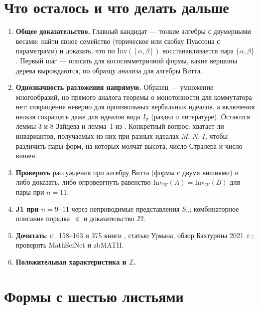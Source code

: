 \documentclass[11pt]{article}
\newcommand{\Inv}{\mathrm{Inv}}
\newcommand{\Z}{\mathbb Z}
\theoremstyle{plain}
\theoremstyle{definition}
\theoremstyle{remark}
\begin{document}
\section{Что осталось и что делать дальше}

\begin{enumerate}
\item \textbf{Общее доказательство.} Главный кандидат --- тонкие алгебры с двумерными весами: найти явное семейство (торическое или скобку Пуассона с параметрами) и доказать, что по $\Inv([\alpha,\beta])$ восстанавливается пара $\{\alpha,\beta\}$. Первый шаг --- описать для кососимметричной формы, какие вершины дерева вырождаются, по образцу анализа для алгебры Витта.
\item \textbf{Однозначность разложения напрямую.} Образец --- умножение многообразий, но прямого аналога теоремы о монотонности для коммутатора нет: сокращение неверно для произвольных вербальных идеалов, а включения нельзя сокращать даже для идеалов вида $I_\sigma$ (раздел о литературе). Остаются леммы 3 и 8 Зайцева и лемма~1 из \cite{Z98}. Конкретный вопрос: хватает ли инвариантов, получаемых из них при разных идеалах $M$, $N$, $I$, чтобы различить пары форм, на которых молчат высота, число Стралера и число вишен.
\item \textbf{Проверить} рассуждения про алгебру Витта (формы с двумя вишнями) и либо доказать, либо опровергнуть равенство $\Inv_W(A)=\Inv_W(B)$ для пары при $n=11$.
\item \textbf{J1 при $n=9$--$11$} через неприводимые представления $S_n$; комбинаторное описание порядка $\preceq$ и доказательство J2.
\item \textbf{Дочитать}: с.~158--163 и 375 книги \cite{Bah}, статью Урмана, обзор Бахтурина 2021~г.; проверить MathSciNet и zbMATH.
\item \textbf{Положительная характеристика и $\Z$.}
\end{enumerate}

\appendix

\section{Формы с шестью листьями}\label{app:atlas}
\end{document}
